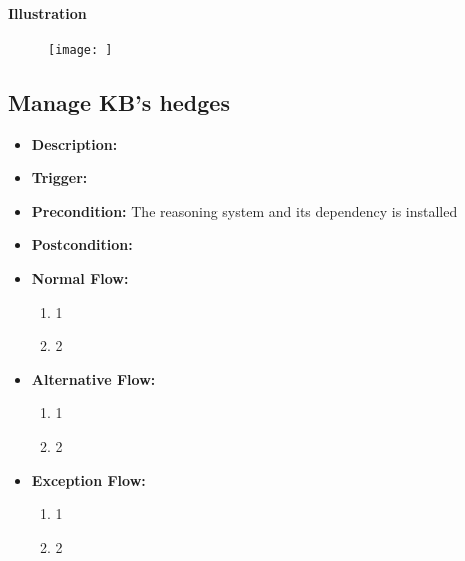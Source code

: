\documentclass[../gr-final.tex]{subfiles}
\begin{document}
\paragraph {Illustration}
\begin{figure}[H]
  \centering
  \texttt{[image: ]}
  \caption{}
\end{figure}
\subsection{Manage KB's hedges}

\begin{itemize}
  \item {\bfseries Description:} 
  \item {\bfseries Trigger:}
  \item {\bfseries Precondition:} The reasoning system and its
    dependency is installed
    
  \item {\bfseries Postcondition:}

  \item {\bfseries Normal Flow:}
    \begin{enumerate}
      \item 1
      \item 2
    \end{enumerate}
  \item {\bfseries Alternative Flow:}
    \begin{enumerate}
      \item 1
      \item 2
    \end{enumerate}
  \item {\bfseries Exception Flow:}
    \begin{enumerate}
      \item 1
      \item 2
    \end{enumerate}
\end{itemize}
\end{document}

